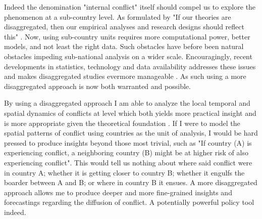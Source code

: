 \documentclass[a4paper]{article}
\begin{document}


Indeed the denomination "internal conflict" itself should compel us to explore the phenomenon at a sub-country level. As formulated by \cite{Cederman_Gleditsch_2009} "If our theories are disaggregated, then our empirical analyses and research designs should reflect this" \citep[490]{Cederman_Gleditsch_2009}. Now, using sub-country units requires more computational power, better models, and not least the right data. Such obstacles have before been natural obstacles impeding sub-national analysis on a wider scale. Encouragingly, recent developments in statistics, technology and data availability addresses these issues and makes disaggregated studies evermore manageable \citep[446]{ol2010afghanistan}. As such using a more disaggregated approach is now both warranted and possible.\par

By using a disaggregated approach I am able to analyze the local temporal and spatial dynamics of conflicts at level which both yields more practical insight and is more appropriate given the theoretical foundation \citep[446]{ol2010afghanistan}. If I were to model the spatial patterns of conflict using countries as the unit of analysis, I would be hard pressed to produce insights beyond those most trivial, such as "If country (A) is experiencing conflict, a neighboring country (B) might be at higher risk of also experiencing conflict". This would tell us nothing about where said conflict were in country A; whether it is getting closer to country B; whether it engulfs the boarder between A and B; or where in country B it ensues. A more disaggregated approach allows me to produce deeper and more fine-grained insights and forecastings regarding the diffusion of conflict. A potentially powerful policy tool indeed.\par 

\end{document}

